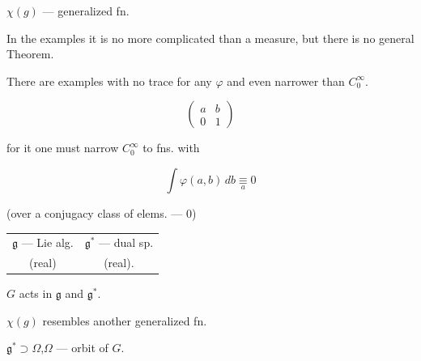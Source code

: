 $\chi (g)$ --- generalized fn.





In the examples it is no more complicated than a measure, but there is no general
Theorem.





There are examples with no trace for any $\varphi$ and even narrower than $C_0^{\infty}$.





\begin{equation*}
\begin{pmatrix}a&b\\0&1\end{pmatrix}
\end{equation*}

for it one must narrow $C_0^{\infty}$ to fns. with





\begin{equation*}
\int\varphi (a, b)\, db\underset{a}{\equiv}0
\end{equation*}

(over a conjugacy class of elems. --- $0$)







\begin{center}\begin{tabular}{cc}
$\mathfrak g$ --- Lie alg.&$\mathfrak g^*$ --- dual sp.\\
(real)&(real).
\end{tabular}\end{center}





$G$ acts in $\mathfrak g$ and $\mathfrak g^*$.

$\chi (g)$ resembles another generalized fn.

$\mathfrak g^*\supset\Omega$,\qquad $\Omega$ --- orbit of $G$.

